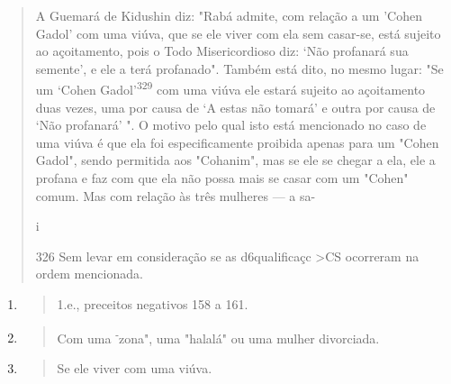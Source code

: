 \begin{quote}
A Guemará de Kidushin diz: "Rabá admite, com relação a um 'Co­hen Gadol'
com uma viúva, que se ele viver com ela sem casar-se, está sujeito ao
açoitamento, pois o Todo Misericordioso diz: `Não profanará sua
semente', e ele a terá profanado". Também está dito, no mesmo lugar: "Se
um `Cohen Gadol'\textsuperscript{329} com uma viúva ele estará sujeito
ao açoitamento duas vezes, uma por causa de `A estas não tomará' e outra
por causa de `Não profanará' ". O motivo pelo qual isto está mencionado
no caso de uma viúva é que ela foi especifica­mente proibida apenas para
um "Cohen Gadol", sendo permitida aos "Coha­nim", mas se ele se chegar a
ela, ele a profana e faz com que ela não possa mais se casar com um
"Cohen" comum. Mas com relação às três mulheres --- a sa-

i

326 Sem levar em consideração se as d6qualificaçc \textgreater CS
ocorreram na ordem mencionada.
\end{quote}

\begin{enumerate}
\def\labelenumi{\arabic{enumi}.}
\setcounter{enumi}{326}
\item
  \begin{quote}
  1.e., preceitos negativos 158 a 161.
  \end{quote}
\item
  \begin{quote}
  Com uma \textsuperscript{-}zona", uma "halalá" ou uma mulher
  divorciada.
  \end{quote}
\item
  \begin{quote}
  Se ele viver com uma viúva.
  \end{quote}
\end{enumerate}

